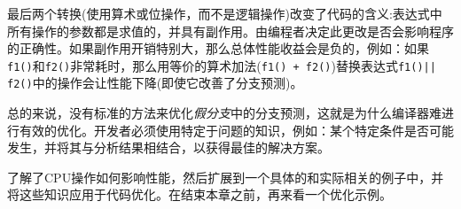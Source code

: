 最后两个转换(使用算术或位操作，而不是逻辑操作)改变了代码的含义:表达式中所有操作的参数都是求值的，并具有副作用。由编程者决定此更改是否会影响程序的正确性。如果副作用开销特别大，那么总体性能收益会是负的，例如：如果\texttt{f1()}和\texttt{f2()}非常耗时，那么用等价的算术加法(\texttt{f1() + f2()})替换表达式\texttt{f1()|| f2()}中的操作会让性能下降(即使它改善了分支预测)。

总的来说，没有标准的方法来优化\textit{假分支}中的分支预测，这就是为什么编译器难进行有效的优化。开发者必须使用特定于问题的知识，例如：某个特定条件是否可能发生，并将其与分析结果相结合，以获得最佳的解决方案。

了解了CPU操作如何影响性能，然后扩展到一个具体的和实际相关的例子中，并将这些知识应用于代码优化。在结束本章之前，再来看一个优化示例。



























